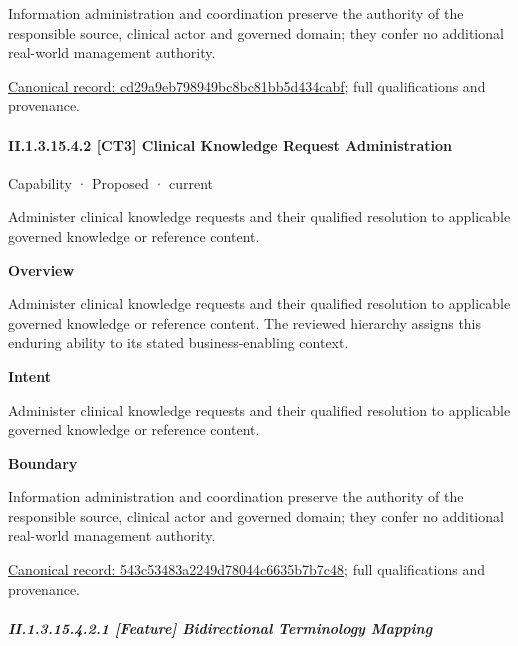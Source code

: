 Information administration and coordination preserve the authority of the responsible source, clinical actor and governed domain; they confer no additional real-world management authority.


{\footnotesize \href{../../../../continuum/strategy/capability/cd29a9eb798949bc8bc81bb5d434cabf.md}{Canonical record: cd29a9eb798949bc8bc81bb5d434cabf}; full qualifications and provenance.}\par
\paragraph*{II.1.3.15.4.2 [CT3] Clinical Knowledge Request Administration}
\label{navigation:II.1.3.15.4.2}

\label{element:543c53483a2249d78044c6635b7b7c48}
{\small Capability · Proposed · current}\par

Administer clinical knowledge requests and their qualified resolution to applicable governed knowledge or reference content.



\textbf{Overview}



Administer clinical knowledge requests and their qualified resolution to applicable governed knowledge or reference content. The reviewed hierarchy assigns this enduring ability to its stated business-enabling context.



\textbf{Intent}



Administer clinical knowledge requests and their qualified resolution to applicable governed knowledge or reference content.



\textbf{Boundary}



Information administration and coordination preserve the authority of the responsible source, clinical actor and governed domain; they confer no additional real-world management authority.


{\footnotesize \href{../../../../continuum/strategy/capability/543c53483a2249d78044c6635b7b7c48.md}{Canonical record: 543c53483a2249d78044c6635b7b7c48}; full qualifications and provenance.}\par
\subparagraph*{II.1.3.15.4.2.1 [Feature] Bidirectional Terminology Mapping}
\label{navigation:II.1.3.15.4.2.1}

